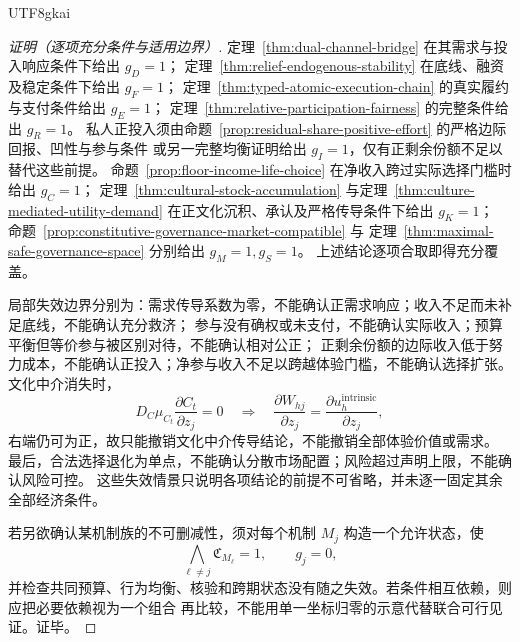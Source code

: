 \documentclass[12pt,a4paper,openany]{report}
\begin{document}
\begin{CJK*}{UTF8}{gkai}
\begin{proof}[证明（逐项充分条件与适用边界）]
定理~\ref{thm:dual-channel-bridge} 在其需求与投入响应条件下给出 \(g_D=1\)；
定理~\ref{thm:relief-endogenous-stability} 在底线、融资及稳定条件下给出 \(g_F=1\)；
定理~\ref{thm:typed-atomic-execution-chain} 的真实履约与支付条件给出 \(g_E=1\)；
定理~\ref{thm:relative-participation-fairness} 的完整条件给出 \(g_R=1\)。
私人正投入须由命题~\ref{prop:residual-share-positive-effort} 的严格边际回报、凹性与参与条件
或另一完整均衡证明给出 \(g_I=1\)，仅有正剩余份额不足以替代这些前提。
命题~\ref{prop:floor-income-life-choice} 在净收入跨过实际选择门槛时给出 \(g_C=1\)；
定理~\ref{thm:cultural-stock-accumulation} 与定理~\ref{thm:culture-mediated-utility-demand}
在正文化沉积、承认及严格传导条件下给出 \(g_K=1\)；
命题~\ref{prop:constitutive-governance-market-compatible} 与
定理~\ref{thm:maximal-safe-governance-space} 分别给出 \(g_M=1,g_S=1\)。
上述结论逐项合取即得充分覆盖。

局部失效边界分别为：需求传导系数为零，不能确认正需求响应；收入不足而未补足底线，不能确认充分救济；
参与没有确权或未支付，不能确认实际收入；预算平衡但等价参与被区别对待，不能确认相对公正；
正剩余份额的边际收入低于努力成本，不能确认正投入；净参与收入不足以跨越体验门槛，不能确认选择扩张。
文化中介消失时，
\[
 D_C\mu_{C_t}\frac{\partial C_t}{\partial z_j}=0
 \quad\Longrightarrow\quad
 \frac{\partial W_{hj}}{\partial z_j}
 =\frac{\partial u_h^{\mathrm{intrinsic}}}{\partial z_j},
\]
右端仍可为正，故只能撤销文化中介传导结论，不能撤销全部体验价值或需求。
最后，合法选择退化为单点，不能确认分散市场配置；风险超过声明上限，不能确认风险可控。
这些失效情景只说明各项结论的前提不可省略，并未逐一固定其余全部经济条件。

若另欲确认某机制族的不可删减性，须对每个机制 \(M_j\) 构造一个允许状态，使
\[
 \bigwedge_{\ell\ne j}\mathfrak C_{M_\ell}=1,\qquad g_j=0,
\]
并检查共同预算、行为均衡、核验和跨期状态没有随之失效。若条件相互依赖，则应把必要依赖视为一个组合
再比较，不能用单一坐标归零的示意代替联合可行见证。证毕。
\end{proof}


\end{CJK*}
\end{document}
